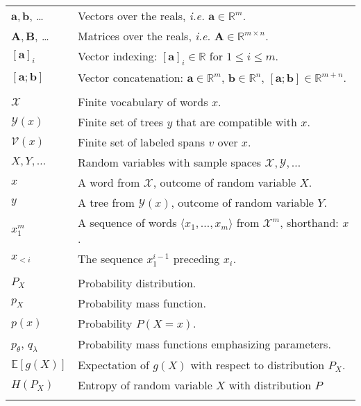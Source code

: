 %
% 

\begin{table}[h]
\center

  \begin{tabular}{ll}

    $\mathbf{a}, \mathbf{b}$, \dots  & Vectors over the reals, \textit{i.e.} $\mathbf{a} \in \mathbb{R}^m$.  \\
    $\mathbf{A}, \mathbf{B}$, \dots & Matrices over the reals, \textit{i.e.} $\mathbf{A} \in \mathbb{R}^{m \times n}$.   \\
    $[\mathbf{a}]_i$ & Vector indexing: $[\mathbf{a}]_i \in \mathbb{R}$ for $1 \leq i \leq m$. \\
    $[\mathbf{a}; \mathbf{b}]$ & Vector concatenation: $\mathbf{a} \in \mathbb{R}^{m}$, $\mathbf{b} \in \mathbb{R}^{n}$, $[\mathbf{a}; \mathbf{b}] \in \mathbb{R}^{m+n}$.  \\
    & \\

    $\mathcal{X}$ & Finite vocabulary of words $x$. \\
    $\mathcal{Y}(x)$ & Finite set of trees $y$ that are compatible with $x$.  \\
    $\mathcal{V}(x)$ & Finite set of labeled spans $v$ over $x$.  \\
    $X, Y, \dots$ & Random variables with sample spaces $\mathcal{X}, \mathcal{Y}, \dots$  \\
    $x$ & A word from $\mathcal{X}$, outcome of random variable $X$.   \\
    $y$ & A tree from $\mathcal{Y}(x)$, outcome of random variable $Y$.  \\
    $x_1^m$ & A sequence of words $\langle x_1, \dots, x_m \rangle$ from $\mathcal{X}^m$, shorthand: $x$. \\
    $x_{<i}$ & The sequence $x_{1}^{i-1}$ preceding $x_i$.  \\
    & \\

    $P_X$ & Probability distribution.  \\
    $p_{X}$ & Probability mass function. \\
    $p(x)$ & Probability $P(X = x)$. \\
    $p_{\theta}$, $q_{\lambda}$ & Probability mass functions emphasizing parameters.   \\
    $\mathbb{E}[g(X)]$ & Expectation of $g(X)$ with respect to distribution $P_X$.  \\
    $H(P_X)$ & Entropy of random variable $X$ with distribution $P$ \\
    & \\


\end{tabular}
\end{table}
